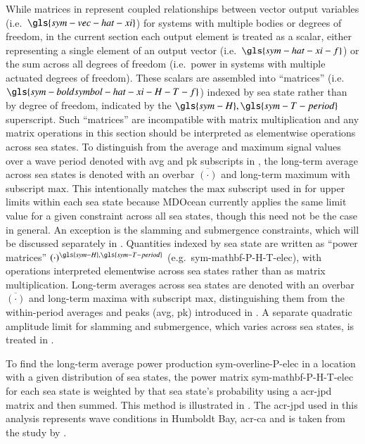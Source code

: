 \ifdefined\DISSERTATION
    While matrices in  represent coupled relationships between vector output variables (i.e.\ $\gls{sym-vec-hat-xi}$) for systems with multiple bodies or degrees of freedom, in the current section each output element is treated as a scalar, either representing a single element of an output vector (i.e.\ $\gls{sym-hat-xi-f}$) or the sum across all degrees of freedom (i.e.\ power in systems with multiple actuated degrees of freedom).
    These scalars are assembled into ``matrices'' (i.e.\ $\gls{sym-boldsymbol-hat-xi-H-T-f}$) indexed by sea state rather than by degree of freedom, indicated by the $\gls{sym-H},\gls{sym-T-period}$ superscript.
    Such ``matrices'' are incompatible with matrix multiplication and any matrix operations in this section should be interpreted as elementwise operations across sea states.
    To distinguish from the average and maximum signal values over a wave period denoted with avg and pk subscripts in , the long-term average across sea states is denoted with an overbar $\overline{(\cdot)}$ and long-term maximum with subscript $\text{max}$.
    This intentionally matches the $\text{max}$ subscript used in  for upper limits within each sea state because MDOcean currently applies the same limit value for a given constraint across all sea states, though this need not be the case in general.
    An exception is the slamming and submergence constraints, which will be discussed separately in .
\else
    Quantities indexed by sea state are written as ``power matrices'' $(\cdot)^{\gls{sym-H},\gls{sym-T-period}}$ (e.g.\ \gls{sym-mathbf-P-H-T-elec}),
    with operations interpreted elementwise across sea states rather than as matrix multiplication.
    Long-term averages across sea states are denoted with an overbar $\overline{(\cdot)}$ and long-term maxima with subscript $\text{max}$,
    distinguishing them from the within-period averages and peaks (avg, pk) introduced in .
    A separate quadratic amplitude limit for slamming and submergence, which varies across sea states, is treated in .
\fi

To find the long-term average power production \gls{sym-overline-P-elec} in a location with a given distribution of sea states, the power matrix \gls{sym-mathbf-P-H-T-elec} for each sea state is weighted by that sea state's probability using a \gls{acr-jpd} matrix and then summed.
This method is illustrated in .
The \gls{acr-jpd} used in this analysis represents wave conditions in Humboldt Bay, \gls{acr-ca} and is taken from the study by \citet{janzou_system_2020}.


